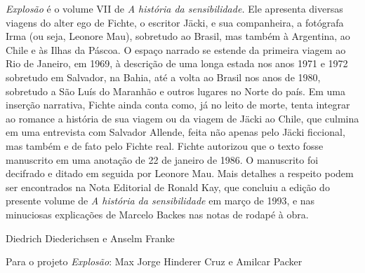 \emph{Explosão} é o volume VII de \emph{A história da sensibilidade.}
Ele apresenta diversas viagens do alter ego de Fichte, o escritor Jäcki,
e sua companheira, a fotógrafa Irma (ou seja, Leonore Mau), sobretudo ao
Brasil, mas também à Argentina, ao Chile e às Ilhas da Páscoa. O espaço
narrado se estende da primeira viagem ao Rio de Janeiro, em 1969, à
descrição de uma longa estada nos anos 1971 e 1972 sobretudo em
Salvador, na Bahia, até a volta ao Brasil nos anos de 1980, sobretudo a
São Luís do Maranhão e outros lugares no Norte do país. Em uma inserção
narrativa, Fichte ainda conta como, já no leito de morte, tenta integrar
ao romance a história de sua viagem ou da viagem de Jäcki ao Chile, que
culmina em uma entrevista com Salvador Allende, feita não apenas pelo
Jäcki ficcional, mas também e de fato pelo Fichte real. Fichte autorizou
que o texto fosse manuscrito em uma anotação de 22 de janeiro de 1986. O
manuscrito foi decifrado e ditado em seguida por Leonore Mau. Mais
detalhes a respeito podem ser encontrados na Nota Editorial de Ronald
Kay, que concluiu a edição do presente volume de \emph{A história da
sensibilidade} em março de 1993, e nas minuciosas explicações de Marcelo
Backes nas notas de rodapé à obra.

Diedrich Diederichsen e Anselm Franke

Para o projeto \emph{Explosão}: Max Jorge Hinderer Cruz e Amilcar Packer

